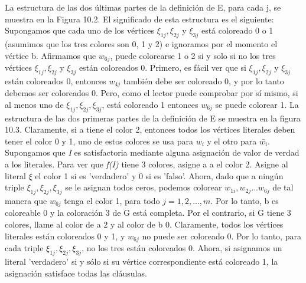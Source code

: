 La estructura de las dos últimas partes de la definición de E, para cada j, se muestra en la Figura 10.2. El significado 
de esta estructura es el siguiente: Supongamos que cada uno de los vértices $\xi_{1j}, \xi_{2j}$ y $\xi_{3j}$ 
está coloreado 0 o 1 (asumimos que los tres colores son 0, 1 y 2) e ignoramos por el momento el vértice b. 
Afirmamos que $w_{6j}$, puede colorearse 1 o 2 si y solo si no los tres vértices $\xi_{1j}, \xi_{2j}$ y $\xi_{3j}$
están coloreados 0. Primero, es fácil ver que si $\xi_{1j}, \xi_{2j}$ y $\xi_{3j}$ están coloreados 0, 
entonces $w_{4j}$ también debe ser coloreado 0, y por lo tanto debemos ser coloreados 0. Pero, como el lector 
puede comprobar por sí mismo, si al menos uno de $\xi_{1j}, \xi_{2j}, \xi_{3j}$, está coloreado 1 entonces 
$w_{6j}$ se puede colorear 1. La estructura de las dos primeras partes de la definición de E se muestra en la 
figura 10.3. Claramente, si a tiene el color 2, entonces todos los vértices literales deben tener el color 0 y 1, 
uno de estos colores se usa para $w_{i}$ y el otro para $\bar{w_{i}}$. Supongamos que \textit{I} es satisfactoria 
mediante alguna asignación de valor de verdad a los literales. Para ver que \textit{f(I)} tiene 3 colores, asigne a 
a el color 2. Asigne al literal $\xi$ el color 1 si es 'verdadero' y 0 si es 'falso'. Ahora, dado que a ningún 
triple $\xi_{1j}, \xi_{2j}, \xi_{3j}$ se le asignan todos ceros, podemos colorear $w_{1i}, w_{2j}. . . w_{6j}$ de 
tal manera que $w_{6j}$ tenga el color 1, para todo $j = 1, 2, ..., m$. Por lo tanto, b es coloreable 0 y la 
coloración 3 de G está completa. Por el contrario, si G tiene 3 colores, llame al color de a 2 y al color de b 0. 
Claramente, todos los vértices literales están coloreados 0 y 1, y $w_{6j}$ no puede ser coloreado 0. Por lo tanto, 
para cada triple $\xi_{1j}, \xi_{2j}, \xi_{3j}$, no los tres están coloreados 0. Ahora, si asignamos un literal 
'verdadero' si y sólo si su vértice correspondiente está coloreado 1, la asignación satisface todas las cláusulas. \\ 


